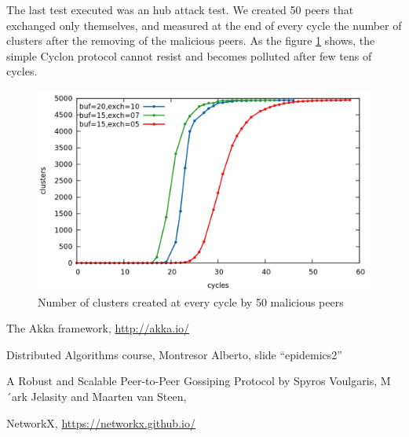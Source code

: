 \documentclass[a4paper,12pt,notitlepage]{article} %
\begin{document}
The last test executed was an hub attack test. We created 50 peers that exchanged only themselves, and measured
 at the end of every cycle the number of clusters after the removing of the malicious peers. As the 
 figure \ref{attack} shows, the simple Cyclon protocol cannot resist and becomes polluted after few tens of cycles.

\begin{figure} [H]
	\centering
	\includegraphics[width=1\textwidth]{img/attack}
	\caption{Number of clusters created at every cycle by 50 malicious peers}
	\label{attack}
\end{figure}


\begin{thebibliography}{9}

  The Akka framework,
  \url{http://akka.io/}

  Distributed Algorithms course,
  Montresor Alberto,
  slide ``epidemics2''


  A Robust and Scalable Peer-to-Peer Gossiping Protocol by
  Spyros Voulgaris, M´ark Jelasity and Maarten van Steen,

  NetworkX,
  \url{https://networkx.github.io/}



\end{thebibliography}
\end{document}
